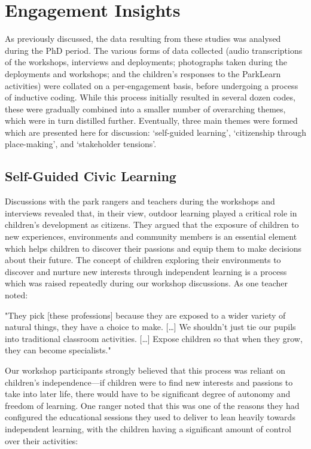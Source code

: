 \section{Engagement Insights}
\label{sec:InfrastructureInsights}
As previously discussed, the data resulting from these studies was analysed during the PhD period. The various forms of data collected (audio transcriptions of the workshops, interviews and deployments; photographs taken during the deployments and workshops; and the children's responses to the ParkLearn activities) were collated on a per-engagement basis, before undergoing a process of inductive coding. While this process initially resulted in several dozen codes, these were gradually combined into a smaller number of overarching themes, which were in turn distilled further. Eventually, three main themes were formed which are presented here for discussion: `self-guided learning', `citizenship through place-making', and `stakeholder tensions'.

\subsection{Self-Guided Civic Learning}

Discussions with the park rangers and teachers during the workshops and interviews revealed that, in their view, outdoor learning played a critical role in children’s development as citizens. They argued that the exposure of children to new experiences, environments and community members is an essential element which helps children to discover their passions and equip them to make decisions about their future. The concept of children exploring their environments to discover and nurture new interests through independent learning is a process which was raised repeatedly during our workshop discussions. As one teacher noted:

\begin{displayquote}
"They pick [these professions] because they are exposed to a wider variety of natural things, they have a choice to make. […] We shouldn’t just tie our pupils into traditional classroom activities. […] Expose children so that when they grow, they can become specialists."
\end{displayquote}

Our workshop participants strongly believed that this process was reliant on children’s independence---if children were to find new interests and passions to take into later life, there would have to be significant degree of autonomy and freedom of learning. One ranger noted that this was one of the reasons they had configured the educational sessions they used to deliver to lean heavily towards independent learning, with the children having a significant amount of control over their activities:


